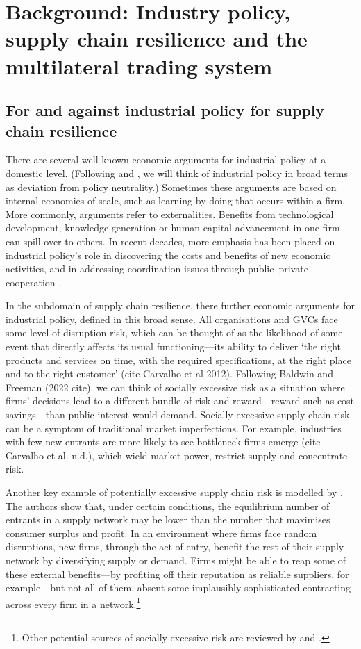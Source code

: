\documentclass{article}
\begin{document}
\section{Background: Industry policy, supply chain resilience and the multilateral trading system}

\subsection{For and against industrial policy for supply chain resilience}

There are several well-known economic arguments for industrial policy at a domestic level. (Following \textcite{harrison_trade_2010} and \textcite{bown_modern_2024}, we will think of industrial policy in broad terms as deviation from policy neutrality.) Sometimes these arguments are based on internal economies of scale, such as learning by doing that occurs within a firm. More commonly, arguments refer to externalities. Benefits from technological development, knowledge generation or human capital advancement in one firm can spill over to others. In recent decades, more emphasis has been placed on industrial policy's role in discovering the costs and benefits of new economic activities, and in addressing coordination issues through public--private cooperation \parencite{rodrik_industrial_nodate}.

In the subdomain of supply chain resilience, there further economic arguments for industrial policy, defined in this broad sense. All organisations and GVCs face some level of disruption risk, which can be thought of as the likelihood of some event that directly affects its usual functioning---its ability to deliver `the right products and services on time, with the required specifications, at the right place and to the right customer' (cite Carvalho et al 2012). Following Baldwin and Freeman (2022 cite), we can think of socially excessive risk as a situation where firms' decisions lead to a different bundle of risk and reward---reward such as cost savings---than public interest would demand. Socially excessive supply chain risk can be a symptom of traditional market imperfections. For example, industries with few new entrants are more likely to see bottleneck firms emerge (cite Carvalho et al. n.d.), which wield market power, restrict supply and concentrate risk.

Another key example of potentially excessive supply chain risk is modelled by \textcite{bimpikis_supply_2019}. The authors show that, under certain conditions, the equilibrium number of entrants in a supply network may be lower than the number that maximises consumer surplus and profit. In an environment where firms face random disruptions, new firms, through the act of entry, benefit the rest of their supply network by diversifying supply or demand. Firms might be able to reap some of these external benefits---by profiting off their reputation as reliable suppliers, for example---but not all of them, absent some implausibly sophisticated contracting across every firm in a network.\footnote{Other potential sources of socially excessive risk are reviewed by \textcite{elliott_networks_2022} and \textcite{hardwick_policy_2024}.} 
\end{document}
